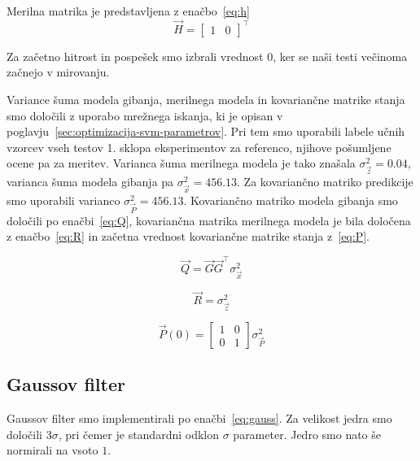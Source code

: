 Merilna matrika je predstavljena z enačbo~\eqref{eq:h}
\begin{equation}
\vec{H} = \begin{bmatrix}
				1 & 0
			\end{bmatrix}^\top 
            \label{eq:h}
\end{equation}

Za začetno hitrost in pospešek smo izbrali vrednost $0$, ker se naši testi večinoma začnejo v mirovanju. 

Variance šuma modela gibanja, merilnega modela in kovariančne matrike stanja smo določili z uporabo mrežnega iskanja, ki je opisan v poglavju~\ref{sec:optimizacija-svm-parametrov}. Pri tem smo uporabili labele učnih vzorcev vseh testov 1. sklopa eksperimentov za referenco, njihove pošumljene ocene pa za meritev. Varianca šuma merilnega modela je tako znašala $\sigma_\vec{z}^2 = \num{0.04}$, varianca šuma modela gibanja pa $\sigma_\vec{x}^2 = \num{456.13}$. Za kovariančno matriko predikcije smo uporabili varianco $\sigma_\vec{P}^2 = \num{456.13}$. Kovariančno matriko modela gibanja smo določili po enačbi~\eqref{eq:Q}, kovariančna matrika merilnega modela je bila določena z enačbo~\eqref{eq:R} in začetna vrednost kovariančne matrike stanja z~\eqref{eq:P}.

\begin{equation}
\vec{Q} = \vec{G} \vec{G}^\top \sigma_\vec{x}^2
\label{eq:Q}
\end{equation}

\begin{equation}
\vec{R} = \sigma_\vec{z}^2
\label{eq:R}
\end{equation}

\begin{equation}
\vec{P}(0) = \begin{bmatrix}
1 & 0 \\
0 & 1
\end{bmatrix} \sigma_\vec{P}^2
\label{eq:P}
\end{equation}










\subsection{Gaussov filter}\label{sec:implementacija-gauss}

Gaussov filter smo implementirali po enačbi~\eqref{eq:gauss}. Za velikost jedra smo določili $3\sigma$, pri čemer je standardni odklon $\sigma$ parameter. Jedro smo nato še normirali na vsoto $1$. 

